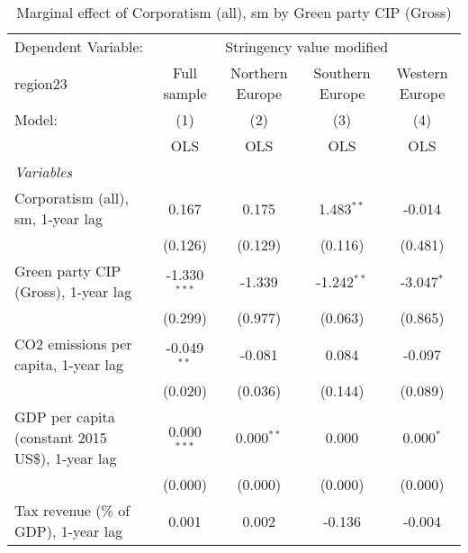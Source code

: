
\begin{table}[htbp]
   \caption{Marginal effect of Corporatism (all), sm by Green party CIP (Gross)}
   \centering
   \begin{tabular}{lcccc}
      \toprule
      Dependent Variable: & \multicolumn{4}{c}{Stringency value modified}\\
      region23                                                                & Full sample    & Northern Europe & Southern Europe & Western Europe \\   
      Model:                                                                  & (1)            & (2)             & (3)             & (4)\\  
                                                                              &  OLS           & OLS             & OLS             & OLS\\  
      \midrule
      \emph{Variables}\\
      Corporatism (all), sm, 1-year lag                                       & 0.167          & 0.175           & 1.483$^{**}$    & -0.014\\   
                                                                              & (0.126)        & (0.129)         & (0.116)         & (0.481)\\   
      Green party CIP (Gross), 1-year lag                                     & -1.330$^{***}$ & -1.339          & -1.242$^{**}$   & -3.047$^{*}$\\   
                                                                              & (0.299)        & (0.977)         & (0.063)         & (0.865)\\   
      CO2 emissions per capita, 1-year lag                                    & -0.049$^{**}$  & -0.081          & 0.084           & -0.097\\   
                                                                              & (0.020)        & (0.036)         & (0.144)         & (0.089)\\   
      GDP per capita (constant 2015 US\$), 1-year lag                         & 0.000$^{***}$  & 0.000$^{**}$    & 0.000           & 0.000$^{*}$\\   
                                                                              & (0.000)        & (0.000)         & (0.000)         & (0.000)\\   
      Tax revenue (\% of GDP), 1-year lag                                     & 0.001          & 0.002           & -0.136          & -0.004\\   

\end{tabular}
\end{table}
